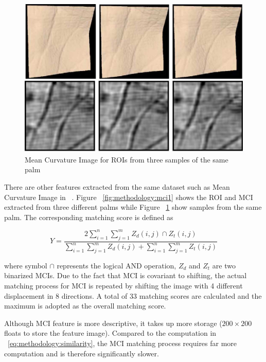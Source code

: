 \begin{figure}[htb]
\begin{center}
\includegraphics[width=0.9\linewidth]{ch-methodology/figures/mci2}
\caption[MCI for ROIs from the same palm]{Mean Curvature Image for ROIs from three samples of the same palm}    \label{fig:methodology:mci2}
\end{center}
\end{figure}

There are other features extracted from the same dataset such as Mean Curvature Image in ~\cite{Zhang:2009dp}. Figure ~\ref{fig:methodology:mci1} shows the ROI and MCI extracted from three different palms while Figure ~\ref{fig:methodology:mci2} show samples from the same palm. The corresponding matching score is defined as

\begin{equation}
Y=\frac{
2\sum \limits_{i=1}^{n} \sum \limits_{j=1}^{m} Z_d(i,j) \cap Z_t(i,j)
}
{
\sum \limits_{i=1}^{n} \sum \limits_{j=1}^{m} Z_d(i,j) +
\sum \limits_{i=1}^{n} \sum \limits_{j=1}^{m} Z_t(i,j)
}
\end{equation}

where symbol $\cap$ represents the logical AND operation, $Z_d$ and $Z_t$ are two binarized MCIs. Due to the fact that MCI is covariant to shifting, the actual matching process for MCI is repeated by shifting the image with 4 different displacement in 8 directions. A total of 33 matching scores are calculated and the maximum is adopted as the overall matching score.

Although MCI feature is more descriptive, it takes up more storage ($200\times200$ floats to store the feature image). Compared to the computation in ~\ref{eq:methodology:similarity}, the MCI matching process requires far more computation and is therefore significantly slower.